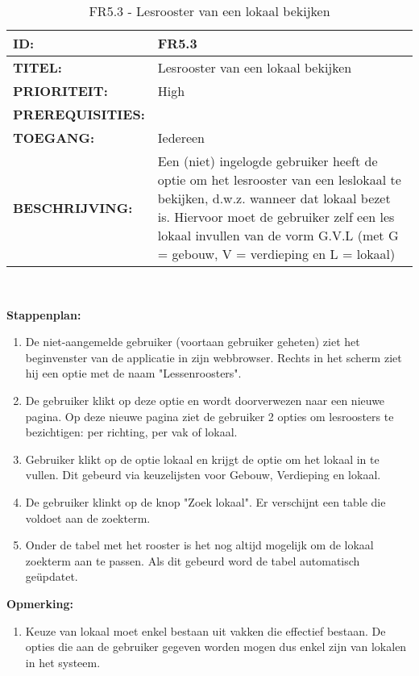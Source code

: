         
\noindent\begin{table}[H]
            \begin{tabular}{l | p{10cm}}
                \textbf{ID:} & FR5.3 \\ \hline
                \textbf{TITEL:} & Lesrooster van een lokaal bekijken\\ \hline
                \textbf{PRIORITEIT:} &  High \\ \hline
                \textbf{PREREQUISITIES:} & \\ \hline
                \textbf{TOEGANG:} &  Iedereen \\ \hline
                \textbf{BESCHRIJVING:} & Een (niet) ingelogde gebruiker heeft de optie om het lesrooster van een leslokaal te bekijken, d.w.z. wanneer dat lokaal bezet is. Hiervoor moet de gebruiker zelf een les lokaal invullen van de vorm G.V.L (met G = gebouw, V = verdieping en L = lokaal)\\
            \end{tabular}\\
            \caption{FR5.3 - Lesrooster van een lokaal bekijken}
            \label{tab:FR5.3 - Lesrooster van een lokaal bekijken}
        \end{table}
        
\textbf{Stappenplan:}
	\begin{enumerate}
	\item De niet-aangemelde gebruiker (voortaan gebruiker geheten) ziet het beginvenster van de applicatie in zijn webbrowser. Rechts in het scherm ziet hij een optie met de naam "Lessenroosters".
		\item De gebruiker klikt op deze optie en wordt doorverwezen naar een nieuwe pagina. Op deze nieuwe pagina ziet de gebruiker 2 opties om lesroosters te bezichtigen: per richting, per vak of lokaal.
		\item Gebruiker klikt op de optie lokaal en krijgt de optie om het lokaal in te vullen. Dit gebeurd via keuzelijsten voor Gebouw, Verdieping en lokaal.
		\item De gebruiker klinkt  op de knop "Zoek lokaal". Er verschijnt een table die voldoet aan de zoekterm. 
		\item Onder de tabel met het rooster is het nog altijd mogelijk om de lokaal zoekterm aan te passen. Als dit gebeurd word de tabel automatisch geüpdatet. 		
	\end{enumerate}

\textbf{Opmerking:}
	\begin{enumerate}
	\item Keuze van lokaal moet enkel bestaan uit vakken die effectief bestaan. De opties die aan de gebruiker gegeven worden mogen dus enkel zijn van lokalen in het systeem.
	\end{enumerate}  

